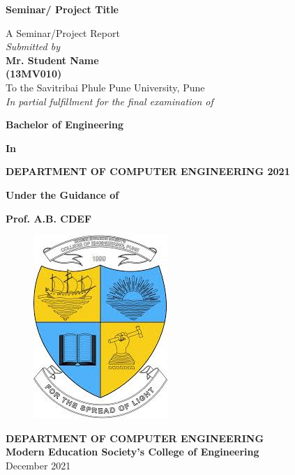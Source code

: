 \begin{center}
{\Large \bf Seminar/ Project Title}

\vspace{0.55in} {A Seminar/Project Report \\
\emph{Submitted by}\\
{\bf Mr.\; Student Name\\
(13MV010)\\}
 \vspace{0.3in}
To the Savitribai Phule Pune University, Pune\\
 \vspace{0.15in}
\emph{In partial fulfillment for the final examination
of}
}


\vspace{0.3in}

{\bf Bachelor of Engineering}

{\bf In}

{\bf {DEPARTMENT OF COMPUTER ENGINEERING 2021\\

}
 
}


\vspace{0.3in} {\bf{Under the Guidance of}}

{\bf Prof. A.B. CDEF\\} 
\vspace{0.3in}

\begin{figure}[!h]
\centering
\includegraphics[scale=0.6]{mes.jpg}\\
\end{figure}
\vspace{0.25cm}
{\bf {DEPARTMENT OF COMPUTER ENGINEERING}}\\
\vspace{0.5cm} {\LARGE{\bf{Modern Education Society's} College of Engineering
\\} }
\vspace{1cm}
{\Large December 2021}
\end{center}
